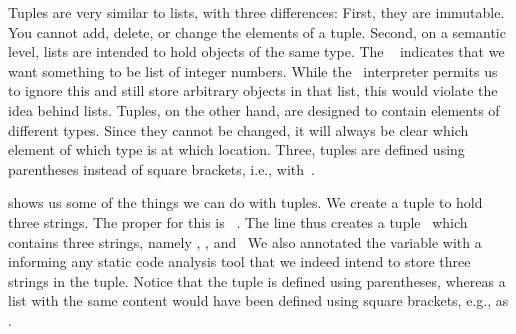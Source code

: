 %
\label{sec:tuples}%
%
%
%
%
%
%
%
%
%
%
%
%
%
%
%
%
%
Tuples are very similar to lists, with three differences:
First, they are immutable.
You cannot add, delete, or change the elements of a tuple.
Second, on a semantic level, lists are intended to hold objects of the same type.
The ~ indicates that we want something to be list of integer numbers.
While the \python\ interpreter permits us to ignore this and still store arbitrary objects in that list, this would violate the idea behind lists.
Tuples, on the other hand, are designed to contain elements of different types.
Since they cannot be changed, it will always be clear which element of which type is at which location.
Three, tuples are defined using parentheses instead of square brackets, i.e., with~\pythonIdx{(\idxdots)}.%
%
%
%
\begin{sloppypar}%
 shows us some of the things we can do with tuples.
We create a tuple  to hold three strings.
The proper  for this is ~\cite{PEP585}.
The line  thus creates a tuple~ which contains three strings, namely , , and~
We also annotated the variable with a  informing any static code analysis tool that we indeed intend to store three strings in the tuple.
Notice that the tuple is defined using parentheses, whereas a list with the same content would have been defined using square brackets, e.g., as .%
\end{sloppypar}%
